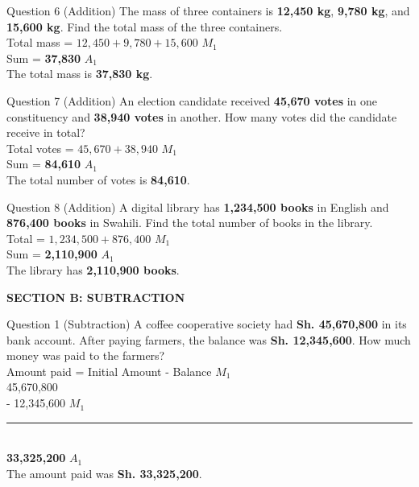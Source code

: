 \documentclass[12pt, a4paper, oneside]{article}
\begin{document}
\begin{solvingbox}{Question 6 (Addition)}
The mass of three containers is \textbf{12,450 kg}, \textbf{9,780 kg}, and \textbf{15,600 kg}. Find the total mass of the three containers. \\
Total mass = $12,450 + 9,780 + 15,600$ \hfill $M_1$ \\
Sum = \textbf{37,830} \hfill $A_1$ \\
The total mass is \textbf{37,830 kg}.
\end{solvingbox}

\begin{solvingbox}{Question 7 (Addition)}
An election candidate received \textbf{45,670 votes} in one constituency and \textbf{38,940 votes} in another. How many votes did the candidate receive in total? \\
Total votes = $45,670 + 38,940$ \hfill $M_1$ \\
Sum = \textbf{84,610} \hfill $A_1$ \\
The total number of votes is \textbf{84,610}.
\end{solvingbox}

\begin{solvingbox}{Question 8 (Addition)}
A digital library has \textbf{1,234,500 books} in English and \textbf{876,400 books} in Swahili. Find the total number of books in the library. \\
Total = $1,234,500 + 876,400$ \hfill $M_1$ \\
Sum = \textbf{2,110,900} \hfill $A_1$ \\
The library has \textbf{2,110,900 books}.
\end{solvingbox}


\begin{center}
    \textbf{\color{strandcolor} SECTION B: SUBTRACTION}
\end{center}

\begin{solvingbox}{Question 1 (Subtraction)}
A coffee cooperative society had \textbf{Sh. 45,670,800} in its bank account. After paying farmers, the balance was \textbf{Sh. 12,345,600}. How much money was paid to the farmers? \\
Amount paid = Initial Amount - Balance \hfill $M_1$ \\
\phantom{-} 45,670,800 \\
- 12,345,600 \hfill $M_1$ \\
\rule{2.5cm}{0.4pt} \\
\textbf{33,325,200} \hfill $A_1$ \\
The amount paid was \textbf{Sh. 33,325,200}.
\end{solvingbox}
\end{document}
